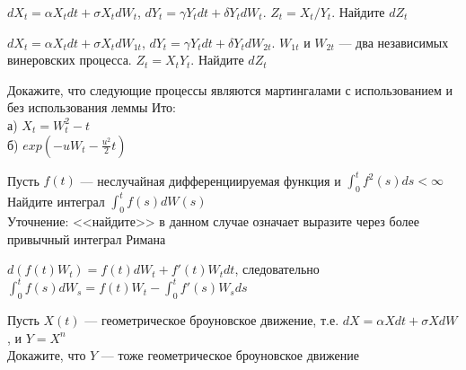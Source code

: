\begin{solution}
\begin{solution}
\begin{solution}
\begin{solution}
\begin{solution}
\begin{solution}
\begin{solution}
\begin{solution}
\begin{solution}
\begin{solution}
\begin{solution}
\end{solution}

\begin{problem}
 $dX_{t}=\alpha X_{t}dt+\sigma X_{t}dW_{t}$, $dY_{t}=\gamma Y_{t}dt+\delta Y_{t}dW_{t}$. $Z_{t}=X_{t}/Y_{t}$. Найдите $dZ_{t}$ 
\end{problem} 
\begin{solution} 

\end{solution}

\begin{problem}
 $dX_{t}=\alpha X_{t}dt+\sigma X_{t}dW_{1t}$, $dY_{t}=\gamma Y_{t}dt+\delta Y_{t}dW_{2t}$. $W_{1t}$ и $W_{2t}$ --- два независимых винеровских процесса. $Z_{t}=X_{t}Y_{t}$. Найдите $dZ_{t}$ 
\end{problem} 
\begin{solution} 

\end{solution}

\begin{problem}
 Докажите, что следующие процессы являются мартингалами с использованием и без использования леммы Ито: \\
а) $X_{t}=W_{t}^{2}-t$ \\
б) $exp(-uW_{t}-\frac{u^{2}}{2}t)$ 
\end{problem} 
\begin{solution} 

\end{solution}

\begin{problem}
Пусть $f(t)$ --- неслучайная дифференциируемая функция и $\int_{0}^{t}f^{2}(s)ds<\infty$ \\
Найдите интеграл $\int_{0}^{t}f(s)dW(s)$ \\
Уточнение: <<найдите>> в данном случае означает выразите через более привычный интеграл Римана 
\end{problem} 
\begin{solution} 
 $d(f(t)W_t)=f(t)dW_t+f'(t)W_tdt$, следовательно $\int_0^t f(s)dW_s=f(t)W_t-\int_0^t f'(s)W_sds$ 
\end{solution}

\begin{problem}
Пусть $X(t)$ --- геометрическое броуновское движение, т.е. $dX=\alpha Xdt+\sigma XdW$, и $Y=X^{n}$ \\
Докажите, что $Y$ --- тоже геометрическое броуновское движение 
\end{problem} 
\begin{solution} 


\end{solution}
\end{solution}
\end{solution}
\end{solution}
\end{solution}
\end{solution}
\end{solution}
\end{solution}
\end{solution}
\end{solution}
\end{solution}
